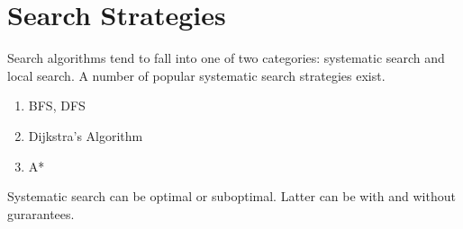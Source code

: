 \section{Search Strategies}
Search algorithms tend to fall into one of two categories:
systematic search and local search.
A number of popular systematic search strategies exist.

\begin{enumerate}
\item{BFS, DFS}
\item{Dijkstra's Algorithm}
\item{A*}
\end{enumerate}

Systematic search can be optimal or suboptimal. Latter can be with 
and without gurarantees.
